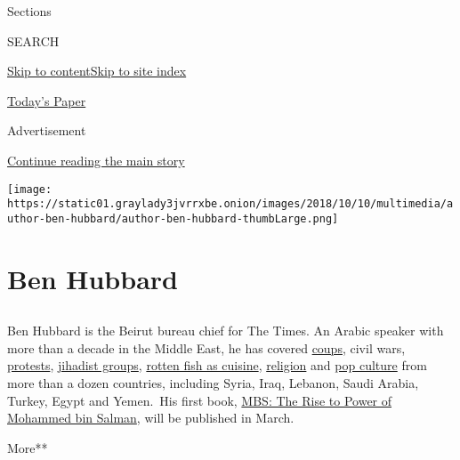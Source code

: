 Sections

SEARCH

\protect\hyperlink{site-content}{Skip to
content}\protect\hyperlink{site-index}{Skip to site index}

\href{https://myaccount.nytimes3xbfgragh.onion/auth/login?response_type=cookie\&client_id=vi}{}

\href{https://www.nytimes3xbfgragh.onion/section/todayspaper}{Today's
Paper}

Advertisement

\protect\hyperlink{after-top}{Continue reading the main story}

\texttt{[image: https://static01.graylady3jvrrxbe.onion/images/2018/10/10/multimedia/author-ben-hubbard/author-ben-hubbard-thumbLarge.png]}

\hypertarget{ben-hubbard}{%
\section{Ben Hubbard}\label{ben-hubbard}}

\subsection{}

Ben Hubbard is the Beirut bureau chief for The Times. An Arabic speaker
with more than a decade in the Middle East, he has covered
\href{https://www.nytimes3xbfgragh.onion/2016/07/23/world/middleeast/failed-turkish-coup-accelerated-a-purge-years-in-the-making.html}{coups},
civil wars,
\href{http://www.nytimes3xbfgragh.onion/2013/08/10/world/middleeast/in-cairo-camps-protesters-dig-in-and-live-on.html}{protests},
\href{https://www.nytimes3xbfgragh.onion/2014/07/24/world/middleeast/islamic-state-controls-raqqa-syria.html}{jihadist
groups},
\href{http://www.nytimes3xbfgragh.onion/2013/05/07/world/middleeast/a-taste-of-spring-that-reeks-of-tradition.html}{rotten
fish as cuisine},
\href{https://www.nytimes3xbfgragh.onion/2016/07/11/world/middleeast/saudi-arabia-islam-wahhabism-religious-police.html}{religion}
and
\href{https://www.nytimes3xbfgragh.onion/2017/05/16/world/middleeast/isis-ramadan-tv-drama.html}{pop
culture} from more than a dozen countries, including Syria, Iraq,
Lebanon, Saudi Arabia, Turkey, Egypt and Yemen.~His first book,
\href{https://www.penguinrandomhouse.com/books/601932/mbs-by-ben-hubbard/}{MBS:
The Rise to Power of Mohammed bin Salman}, will be published in March.

More**

